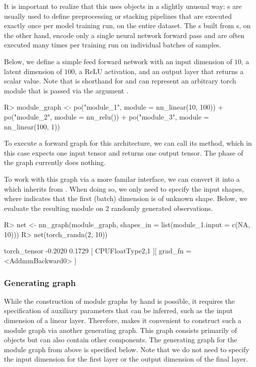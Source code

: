 \documentclass[article]{jss}
\theoremstyle{definition}
\begin{document}
It is important to realize that this uses  objects in a slightly unusual way:
 s are usually used to define preprocessing or stacking pipelines that are executed exactly once per model training run, on the entire dataset.
The s built from s, on the other hand, encode only a single neural network forward pass and are often executed many times per training run on individual batches of samples.

Below, we define a simple feed forward network with an input dimension of $10$, a latent dimension of $100$, a ReLU activation, and an output layer that returns a scalar value.
Note that  is shorthand for  and can represent an arbitrary torch module that is passed via the argument .

\begin{CodeInput}
R> module_graph <- po("module_1", module = nn_linear(10, 100)) %
+   po("module_2", module = nn_relu()) %
+   po("module_3", module = nn_linear(100, 1))
\end{CodeInput}

To execute a forward graph for this architecture, we can call its  method, which in this case expects one input tensor and returns one output tensor.
The  phase of the graph currently does nothing.

To work with this graph via a more familar interface, we can convert it into a  which inherits from .
When doing so, we only need to specify the input shapes, where  indicates that the first (batch) dimension is of unknown shape.
Below, we evaluate the resulting module on 2 randomly generated observations.

\begin{CodeInput}
R> net <- nn_graph(module_graph, shapes_in = list(module_1.input = c(NA, 10)))
R> net(torch_randn(2, 10))
\end{CodeInput}
\begin{CodeOutput}
torch_tensor
-0.2020
 0.1729
[ CPUFloatType{2,1} ][ grad_fn = <AddmmBackward0> ]
\end{CodeOutput}

\subsubsection{Generating graph}

While the construction of module graphs by hand is possible, it requires the specification of auxiliary parameters that can be inferred, such as the input dimension of a linear layer.
Therefore,  makes it convenient to construct such a module graph via another generating graph.
This graph consists primarily of  objects but can also contain other components.
The generating graph for the module graph from above is specified below.
Note that we do not need to specify the input dimension for the first layer or the output dimension of the final layer.
\end{document}

